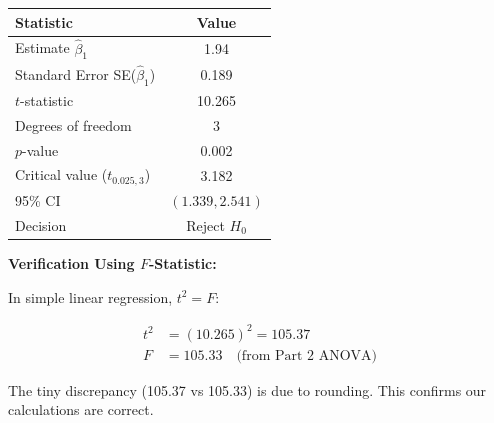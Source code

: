 \documentclass[12pt]{article}
\begin{document}
\begin{solution}
\begin{center}
\begin{tabular}{|l|c|}
\hline
\textbf{Statistic} & \textbf{Value} \\
\hline
Estimate $\hat{\beta}_1$ & 1.94 \\
Standard Error SE($\hat{\beta}_1$) & 0.189 \\
$t$-statistic & 10.265 \\
Degrees of freedom & 3 \\
$p$-value & 0.002 \\
Critical value ($t_{0.025,3}$) & 3.182 \\
95\% CI & $(1.339, 2.541)$ \\
Decision & Reject $H_0$ \\
\hline
\end{tabular}
\end{center}

\textbf{Verification Using $F$-Statistic:}

In simple linear regression, $t^2 = F$:

\begin{align*}
t^2 &= (10.265)^2 = 105.37 \\
F &= 105.33 \quad \text{(from Part 2 ANOVA)}
\end{align*}

The tiny discrepancy (105.37 vs 105.33) is due to rounding. This confirms our calculations are correct.
\end{solution}
\end{document}
